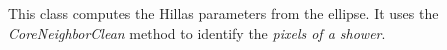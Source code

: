 This class computes the Hillas parameters from the ellipse. It uses
the {\em CoreNeighborClean} method to identify the {\em pixels of a
  shower}.
